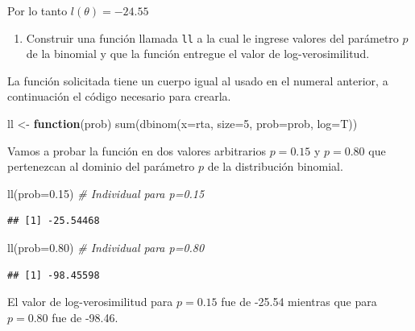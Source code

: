 \documentclass[
]{book}
\makeatletter
\newenvironment{Shaded}{\begin{snugshade}}{\end{snugshade}}
\newcommand{\AttributeTok}[1]{\textcolor[rgb]{0.77,0.63,0.00}{#1}}
\newcommand{\CommentTok}[1]{\textcolor[rgb]{0.56,0.35,0.01}{\textit{#1}}}
\newcommand{\ControlFlowTok}[1]{\textcolor[rgb]{0.13,0.29,0.53}{\textbf{#1}}}
\newcommand{\DecValTok}[1]{\textcolor[rgb]{0.00,0.00,0.81}{#1}}
\newcommand{\FloatTok}[1]{\textcolor[rgb]{0.00,0.00,0.81}{#1}}
\newcommand{\FunctionTok}[1]{\textcolor[rgb]{0.00,0.00,0.00}{#1}}
\newcommand{\NormalTok}[1]{#1}
\newcommand{\OtherTok}[1]{\textcolor[rgb]{0.56,0.35,0.01}{#1}}
\providecommand{\tightlist}{%
  \setlength{\itemsep}{0pt}\setlength{\parskip}{0pt}}
\newenvironment{kframe}{%
\medskip{}
\setlength{\fboxsep}{.8em}
 \def\at@end@of@kframe{}%
 \ifinner\ifhmode%
  \def\at@end@of@kframe{\end{minipage}}%
  \begin{minipage}{\columnwidth}%
 \fi\fi%
 \def\FrameCommand##1{\hskip\@totalleftmargin \hskip-\fboxsep
 \colorbox{shadecolor}{##1}\hskip-\fboxsep
     \hskip-\linewidth \hskip-\@totalleftmargin \hskip\columnwidth}%
 \MakeFramed {\advance\hsize-\width
   \@totalleftmargin\z@ \linewidth\hsize
   \@setminipage}}%
 {\par\unskip\endMakeFramed%
 \at@end@of@kframe}
\renewenvironment{Shaded}{\begin{kframe}}{\end{kframe}}
\makeatother
\begin{document}
Por lo tanto \(l(\theta)= -24.55\)

\begin{enumerate}
\def\labelenumi{\arabic{enumi})}
\setcounter{enumi}{1}
\tightlist
\item
  Construir una función llamada \texttt{ll} a la cual le ingrese valores del parámetro \(p\) de la binomial y que la función entregue el valor de log-verosimilitud.
\end{enumerate}

La función solicitada tiene un cuerpo igual al usado en el numeral anterior, a continuación el código necesario para crearla.

\begin{Shaded}
\begin{Highlighting}[]
\NormalTok{ll }\OtherTok{\textless{}{-}} \ControlFlowTok{function}\NormalTok{(prob) }\FunctionTok{sum}\NormalTok{(}\FunctionTok{dbinom}\NormalTok{(}\AttributeTok{x=}\NormalTok{rta, }\AttributeTok{size=}\DecValTok{5}\NormalTok{, }\AttributeTok{prob=}\NormalTok{prob, }\AttributeTok{log=}\NormalTok{T))}
\end{Highlighting}
\end{Shaded}

Vamos a probar la función en dos valores arbitrarios \(p=0.15\) y \(p=0.80\) que pertenezcan al dominio del parámetro \(p\) de la distribución binomial.

\begin{Shaded}
\begin{Highlighting}[]
\FunctionTok{ll}\NormalTok{(}\AttributeTok{prob=}\FloatTok{0.15}\NormalTok{)  }\CommentTok{\# Individual para p=0.15}
\end{Highlighting}
\end{Shaded}

\begin{verbatim}
## [1] -25.54468
\end{verbatim}

\begin{Shaded}
\begin{Highlighting}[]
\FunctionTok{ll}\NormalTok{(}\AttributeTok{prob=}\FloatTok{0.80}\NormalTok{)  }\CommentTok{\# Individual para p=0.80}
\end{Highlighting}
\end{Shaded}

\begin{verbatim}
## [1] -98.45598
\end{verbatim}

El valor de log-verosimilitud para \(p=0.15\) fue de -25.54 mientras que para \(p=0.80\) fue de -98.46.
\end{document}
